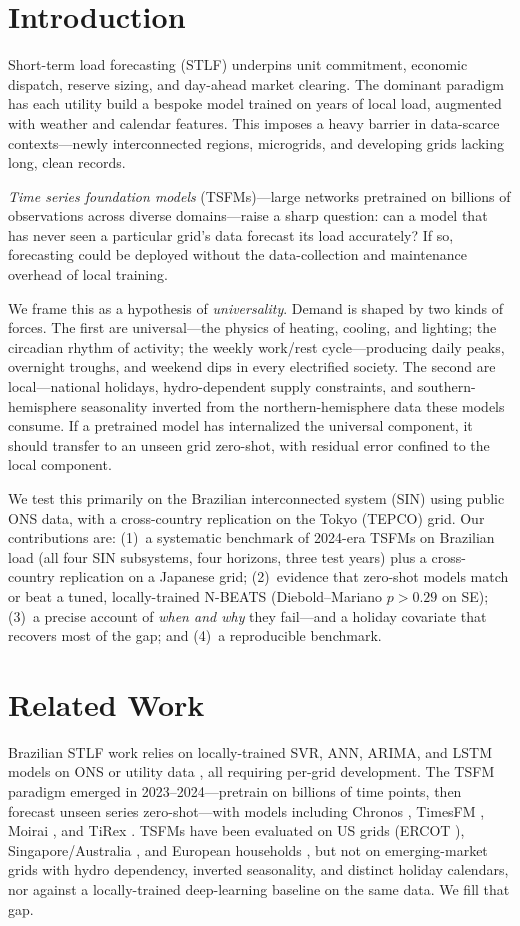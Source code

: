 \documentclass[conference]{IEEEtran}
\begin{document}
\section{Introduction}
Short-term load forecasting (STLF) underpins unit commitment, economic dispatch,
reserve sizing, and day-ahead market clearing. The dominant paradigm has each utility
build a bespoke model trained on years of local load, augmented with weather and
calendar features. This imposes a heavy barrier in data-scarce contexts---newly
interconnected regions, microgrids, and developing grids lacking long, clean records.

\emph{Time series foundation models} (TSFMs)---large networks pretrained on billions of
observations across diverse domains---raise a sharp question: can a model that has never
seen a particular grid's data forecast its load accurately? If so, forecasting could be
deployed without the data-collection and maintenance overhead of local training.

We frame this as a hypothesis of \emph{universality}. Demand is shaped by two kinds of
forces. The first are universal---the physics of heating, cooling, and lighting; the
circadian rhythm of activity; the weekly work/rest cycle---producing daily peaks,
overnight troughs, and weekend dips in every electrified society. The second are
local---national holidays, hydro-dependent supply constraints, and southern-hemisphere
seasonality inverted from the northern-hemisphere data these models consume. If a
pretrained model has internalized the universal component, it should transfer to an
unseen grid zero-shot, with residual error confined to the local component.

We test this primarily on the Brazilian interconnected system (SIN) using public ONS
data, with a cross-country replication on the Tokyo (TEPCO) grid. Our contributions are:
(1)~a systematic benchmark of 2024-era TSFMs on Brazilian load (all four SIN subsystems,
four horizons, three test years) plus a cross-country replication on a Japanese grid;
(2)~evidence that zero-shot models match or beat a tuned, locally-trained N-BEATS
(Diebold--Mariano $p>0.29$ on SE); (3)~a precise account of \emph{when and why} they
fail---and a holiday covariate that recovers most of the gap; and (4)~a reproducible
benchmark.

\section{Related Work}
Brazilian STLF work relies on locally-trained SVR, ANN, ARIMA, and LSTM models on ONS
or utility data \cite{santos2023,velasquez2022,oliveira2023}, all requiring per-grid
development. The TSFM paradigm emerged in 2023--2024---pretrain on billions of time
points, then forecast unseen series zero-shot---with models including Chronos
\cite{chronos}, TimesFM \cite{timesfm}, Moirai \cite{moirai}, and TiRex \cite{tirex}.
TSFMs have been evaluated on US grids (ERCOT \cite{ercot}), Singapore/Australia
\cite{exo}, and European households \cite{household}, but not on emerging-market grids
with hydro dependency, inverted seasonality, and distinct holiday calendars, nor against
a locally-trained deep-learning baseline on the same data. We fill that gap.
\end{document}

